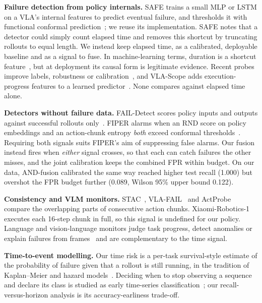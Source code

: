 \documentclass[conference,a4paper]{IEEEtran}
\begin{document}
\textbf{Failure detection from policy internals.} SAFE trains a small MLP or LSTM on a
VLA's internal features to predict eventual failure, and thresholds it with functional
conformal prediction~\cite{gu2025safe}; we reuse its implementation. SAFE notes that a
detector could simply count elapsed time and removes this shortcut by truncating rollouts to
equal length. We instead keep elapsed time, as a calibrated, deployable baseline and as a
signal to fuse. In machine-learning terms, duration is a shortcut
feature~\cite{geirhos2020shortcut}, but at deployment its causal form is legitimate
evidence. Recent probes improve labels, robustness or
calibration~\cite{park2026hideseek,ma2026failurespot,rajaprakash2026safecast}, and VLA-Scope
adds execution-progress features to a learned predictor~\cite{zhu2026vlascope}. None compares
against elapsed time alone.

\textbf{Detectors without failure data.} FAIL-Detect scores policy inputs and outputs
against successful rollouts only~\cite{xu2025faildetect}. FIPER alarms when an RND score on
policy embeddings and an action-chunk entropy \emph{both} exceed conformal
thresholds~\cite{romer2025fiper}. Requiring both signals suits FIPER's aim of suppressing
false alarms. Our fusion instead fires when \emph{either} signal crosses, so that each can
catch failures the other misses, and the joint calibration keeps the combined FPR within
budget. On our data, AND-fusion calibrated the same way reached higher test recall
(1.000) but overshot the FPR budget further (0.089, Wilson 95\% upper bound 0.122).

\textbf{Consistency and VLM monitors.} STAC~\cite{agia2024sentinel},
VLA-FAIL~\cite{seligmann2026vlafail} and ActProbe~\cite{huang2026actprobe} compare the
overlapping parts of consecutive action chunks. Xiaomi-Robotics-1 executes each 16-step chunk
in full, so this signal is undefined for our policy. Language and vision-language monitors judge
task progress, detect anomalies or explain failures from
frames~\cite{agia2024sentinel,duan2025aha,liu2023reflect,sinha2024realtime,zhou2025codeasmonitor}
and are complementary to the time signal.

\textbf{Time-to-event modelling.} Our time risk is a per-task survival-style estimate of
the probability of failure given that a rollout is still running, in the tradition of
Kaplan--Meier and hazard models~\cite{kaplan1958,cox1972}. Deciding when to stop observing
a sequence and declare its class is studied as early time-series
classification~\cite{xing2012early}; our recall-versus-horizon analysis is its
accuracy-earliness trade-off.
\end{document}
